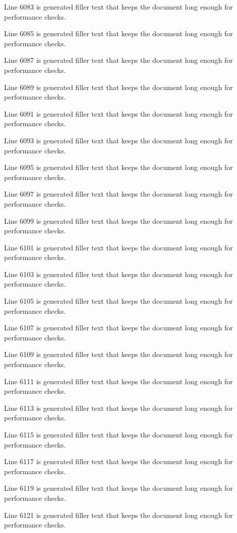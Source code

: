 Line 6083 is generated filler text that keeps the document long enough for performance checks.

Line 6085 is generated filler text that keeps the document long enough for performance checks.

Line 6087 is generated filler text that keeps the document long enough for performance checks.

Line 6089 is generated filler text that keeps the document long enough for performance checks.

Line 6091 is generated filler text that keeps the document long enough for performance checks.

Line 6093 is generated filler text that keeps the document long enough for performance checks.

Line 6095 is generated filler text that keeps the document long enough for performance checks.

Line 6097 is generated filler text that keeps the document long enough for performance checks.

Line 6099 is generated filler text that keeps the document long enough for performance checks.

Line 6101 is generated filler text that keeps the document long enough for performance checks.

Line 6103 is generated filler text that keeps the document long enough for performance checks.

Line 6105 is generated filler text that keeps the document long enough for performance checks.

Line 6107 is generated filler text that keeps the document long enough for performance checks.

Line 6109 is generated filler text that keeps the document long enough for performance checks.

Line 6111 is generated filler text that keeps the document long enough for performance checks.

Line 6113 is generated filler text that keeps the document long enough for performance checks.

Line 6115 is generated filler text that keeps the document long enough for performance checks.

Line 6117 is generated filler text that keeps the document long enough for performance checks.

Line 6119 is generated filler text that keeps the document long enough for performance checks.

Line 6121 is generated filler text that keeps the document long enough for performance checks.

